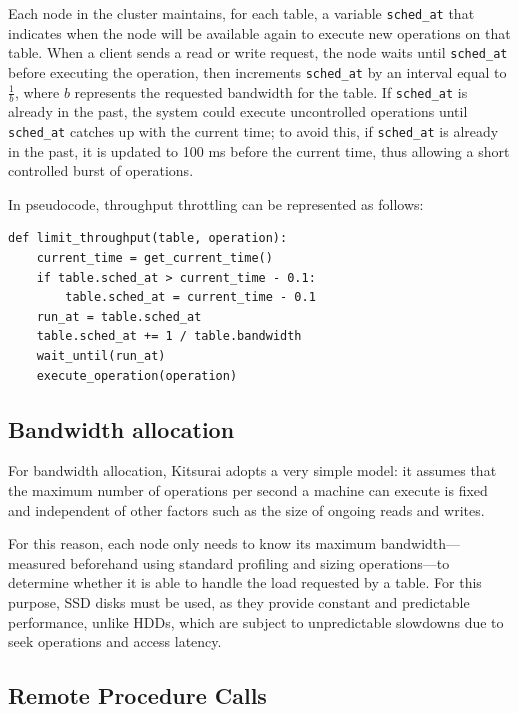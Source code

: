 Each node in the cluster maintains, for each table, a variable \texttt{sched\_at} that indicates when the node will be available again to execute new operations on that table.
When a client sends a read or write request, the node waits until \texttt{sched\_at} before executing the operation, then increments \texttt{sched\_at} by an interval equal to $\displaystyle \frac{1}{b}$, where $b$ represents the requested bandwidth for the table.
If \texttt{sched\_at} is already in the past, the system could execute uncontrolled operations until \texttt{sched\_at} catches up with the current time; to avoid this, if \texttt{sched\_at} is already in the past, it is updated to 100 ms before the current time, thus allowing a short controlled burst of operations.

\begin{samepage}
    \noindent In pseudocode, throughput throttling can be represented as follows:
    \begin{verbatim}
def limit_throughput(table, operation):
    current_time = get_current_time()
    if table.sched_at > current_time - 0.1:
        table.sched_at = current_time - 0.1
    run_at = table.sched_at
    table.sched_at += 1 / table.bandwidth
    wait_until(run_at)
    execute_operation(operation)
    \end{verbatim}
\end{samepage}

\subsection{Bandwidth allocation}
\label{subsec:bandwidth-allocation}

For bandwidth allocation, Kitsurai adopts a very simple model: it assumes that the maximum number of operations per second a machine can execute is fixed and independent of other factors such as the size of ongoing reads and writes.

For this reason, each node only needs to know its maximum bandwidth---measured beforehand using standard profiling and sizing operations---to determine whether it is able to handle the load requested by a table.
For this purpose, SSD disks must be used, as they provide constant and predictable performance, unlike HDDs, which are subject to unpredictable slowdowns due to seek operations and access latency.

\subsection{Remote Procedure Calls}
\label{subsec:rpc}

